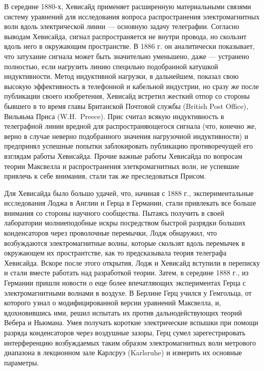 \documentclass[12pt, oneside, a4paper]{article}
\begin{document}
В середине 1880-х, Хевисайд применяет расширенную материальными связями систему уравнений для исследования вопроса распространения электромагнитных волн вдоль электрической линнн --- основную задачу телеграфии. Согласно выводам Хевисайда, сигнал распространяется не внутри провода, но скользит вдоль него в окружающнм пространстве. В 1886 г. он аналитически показывает, что затухание сигнала может быть значительно уменьшено, даже --- устранено полностью, если нагрузить линию специльно подобранной катушкой индуктивности. Метод индуктивной нагрузки, в дальнейшем, показал свою высокую эффективность в телефонной и кабельной индустрии, но сразу же после публикации своего изобретения, Хевисайд встретил жесткий отпор со стороны бывшего в то время главы Британской Почтовой службы (British Post Office), Вильяьма Приса (W.H.~Preece). Прис считал всякую индуктивность в телеграфной линии вредной для распространяющегося сигнала (что, конечно же, верно в случае неверно подобранного значения нагрузочной индуктивности) и предпринял успешные попытки заблокировать публикацию противоречущей его взглядам работы Хевисайда. Прочие важные работы Хевисайда по вопросам теории Максвелла и распространения элеткромагнитных волн, не успевшие привлечь к себе внимания, стали так же преследоваться Присом.

Для Хевисайда было большо удачей, что, начиная с 1888 г., экспериментальные исследования Лоджа в Англии и Герца в Германии, стали привлекать все больше внимания со стороны научного сообщества. Пытаясь получить в своей лаборатории молниеподобные искры посредством быстрой разрядки больших конденсаторов через проволочные перемычки, Лодж обнаружил, что возбуждаются электромагнитные волны, которые скользят вдоль перемычек в окружающем их пространтстве, как то предсказывала теория телеграфа Хевисайда. Вскоре после этого открытия, Лодж и Хевисайд вступили в переписку и стали вместе работать над разработкой теории. Затем, в середине 1888 г., из Германии пришли новости о еще более впечатляющих экспериментах Герца с электромагнитными волнами в воздухе.  В Берлине Герц учился у Гемгольца, от которого узнал о модифицированной версии уравнений Максвелла, и, вдохновившись ими, решил испытать их против дальнодействующих теорий Вебера и Ньюмана. Умея получать короткие электрические вспышки при помощи разряда конденсаторов через воздушные зазоры, Герц сумел зарегестрировать интерференцию возбуждаемых таким образом электромагнитных волн метрового диапазона в  лекционном зале Карлсруэ (Karlsruhe) и измерить их основные параметры.
\end{document}
